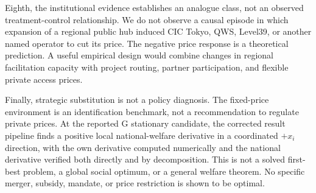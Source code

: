 Eighth, the institutional evidence establishes an analogue class, not an observed treatment-control relationship. We do not observe a causal episode in which expansion of a regional public hub induced CIC Tokyo, QWS, Level39, or another named operator to cut its price. The negative price response is a theoretical prediction. A useful empirical design would combine changes in regional facilitation capacity with project routing, partner participation, and flexible private access prices.

Finally, strategic substitution is not a policy diagnosis. The fixed-price environment is an identification benchmark, not a recommendation to regulate private prices. At the reported G stationary candidate, the corrected result pipeline finds a positive local national-welfare derivative in a coordinated $+x_i$ direction, with the own derivative computed numerically and the national derivative verified both directly and by decomposition. This is not a solved first-best problem, a global social optimum, or a general welfare theorem. No specific merger, subsidy, mandate, or price restriction is shown to be optimal.
